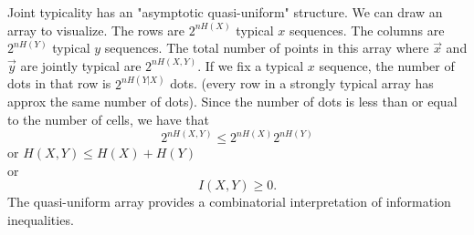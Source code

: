 \documentclass[../main.tex]{subfiles}
\begin{document}
Joint typicality has an "asymptotic quasi-uniform" structure. We can draw an array to visualize. The rows are $2^{nH(X)}$ typical $x$ sequences. The columns are $2^{nH(Y)}$ typical $y$ sequences. The total number of points in this array where $\vec x$ and $\vec y$ are jointly typical are $2^{nH(X,Y)}$. If we fix a typical $x$ sequence, the number of dots in that row is $2^{nH(Y|X)}$ dots. (every row in a strongly typical array has approx the same number of dots).
Since the number of dots is less than or equal to the number of cells, we have that \[
2^{nH(X,Y)}\leq 2^{nH(X)}2^{nH(Y)}
\]
or $H(X,Y)\leq H(X)+H(Y)$\\
or \[
I(X,Y)\geq 0.
\]
The quasi-uniform array provides a combinatorial interpretation of information inequalities.
\end{document}
